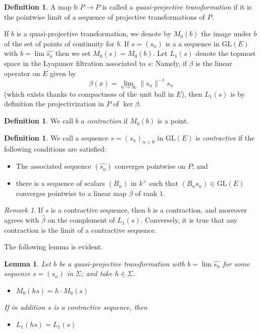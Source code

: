 \documentclass{amsart}
\theoremstyle{plain}
\newtheorem{lemma}[theorem]{Lemma}
\theoremstyle{definition}
\newtheorem{definition}[theorem]{Definition}
\theoremstyle{remark}
\newtheorem{remark}[theorem]{Remark}
\providecommand{\norm}[1]{\lVert#1\rVert}
\begin{document}
\begin{definition}
A map $b: P \to P$ is called a \emph{quasi-projective transformation} if it is the pointwise
limit of a sequence of projective transformations of $P$.
\end{definition}

If $b$ is a quasi-projective transformation, we denote by $M_{0}(b)$ the image
under $b$ of the set of points of continuity for $b$. If $s = (s_{n})$ is a a sequence in $\mathrm{GL}(E)$
with $b = \lim \widehat{s_{n}}$ then we set $M_{0}(s) = M_{0}(b)$. Let $L_{1}(s)$ denote
the topmost space in the Lyapunov filtration associated to $s$: Namely, if $\beta$ is
the linear operator on $E$ given by
$$\beta(x) = \lim_{n \to \infty} \norm{s_{n}}^{-1} s_{n}$$
(which exists thanks to compactness of the unit ball in $E$), then $L_{1}(s)$ is by
definition the projectivization in $P$ of $\ker
\beta$.

\begin{definition}
We call $b$ a \emph{contraction} if $M_{0}(b)$ is a point.
\end{definition}

\begin{definition}
We call a sequence $s = (s_{n})_{n > 0}$ in $\mathrm{GL}(E)$ is \emph{contractive}
if the following conditions are satisfied:
\begin{itemize}
\item[(i)] The associated sequence $(\widehat{s_{n}})$ converges
pointwise on $P$; and
\item[(ii)] there is a sequence of scalars $(B_{n})$ in $k^{\times}$ such that
$(B_{n}s_{n}) \in \mathrm{GL}(E)$ converges pointwise to a linear map $\beta$ of rank
$1$.
\end{itemize} 
\end{definition}

\begin{remark}
If $s$ is a contractive sequence, then $b$ is a contraction, and moreover
agrees with $\widehat{\beta}$
on the complement of $L_{1}(s)$. Conversely, it is true that any
contraction is the limit of a contractive sequence.
\end{remark}

The following lemma is evident.

\begin{lemma}\label{lem:4basic}
Let $b$ be a quasi-projective transformation with
$b = \lim \widehat{s_{n}}$ for some sequence $s = (s_{n})$ in $\Sigma$; and take $h \in
\Sigma$.
\begin{itemize}
\item[(i)]  $M_{0}(hs) = h \cdot M_{0}(s)$
\end{itemize}

If in addition $s$ is a contractive sequence, then
\begin{itemize}
\item[(ii)] $L_{1}(hs) = L_{1}(s)$
\end{itemize}
\end{lemma}
\end{document}
